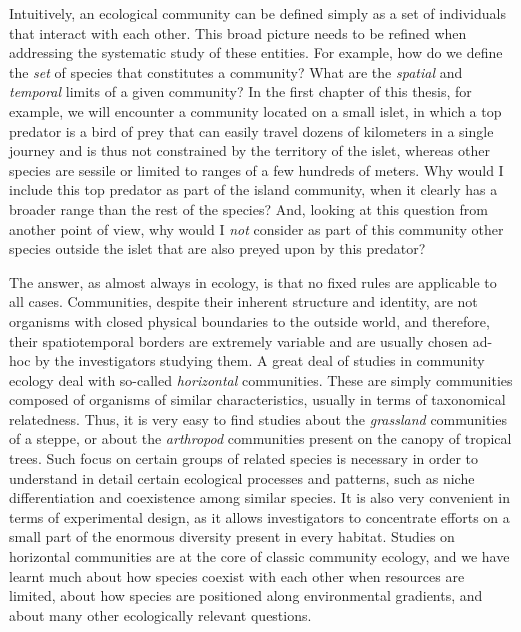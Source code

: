Intuitively, an ecological community can be defined simply as a set of individuals that interact with each other. This broad picture needs to be refined when addressing the systematic study of these entities. For example, how do we define the \textit{set} of species that constitutes a community? What are the \textit{spatial} and \textit{temporal} limits of a given community? In the first chapter of this thesis, for example, we will encounter a community located on a small islet, in which a top predator is a bird of prey that can easily travel dozens of kilometers in a single journey and is thus not constrained by the territory of the islet, whereas other species are sessile or limited to ranges of a few hundreds of meters. Why would I include this top predator as part of the island community, when it clearly has a broader range than the rest of the species? And, looking at this question from another point of view, why would I \textit{not} consider as part of this community other species outside the islet that are also preyed upon by this predator?

The answer, as almost always in ecology, is that no fixed rules are applicable to all cases. Communities, despite their inherent structure and identity, are not organisms with closed physical boundaries to the outside world, and therefore, their spatiotemporal borders are extremely variable and are usually chosen ad-hoc by the investigators studying them. A great deal of studies in community ecology deal with so-called \textit{horizontal} communities. These are simply communities composed of organisms of similar characteristics, usually in terms of taxonomical relatedness. Thus, it is very easy to find studies about the \textit{grassland} communities of a steppe, or about the \textit{arthropod} communities present on the canopy of tropical trees. Such focus on certain groups of related species is necessary in order to understand in detail certain ecological processes and patterns, such as niche differentiation and coexistence among similar species. It is also very convenient in terms of experimental design, as it allows investigators to concentrate efforts on a small part of the enormous diversity present in every habitat. Studies on horizontal communities are at the core of classic community ecology, and we have learnt much about how species coexist with each other when resources are limited, about how species are positioned along environmental gradients, and about many other ecologically relevant questions.

